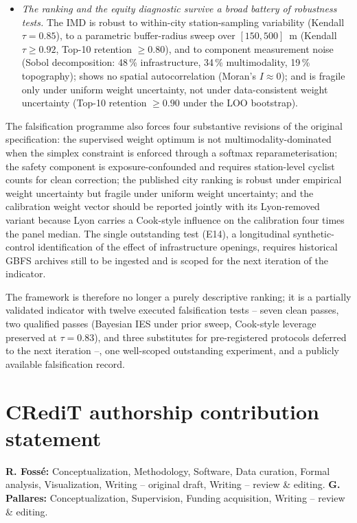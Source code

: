 \documentclass[11pt,a4paper]{article}
\begin{document}
\begin{itemize}
\item[\textbf{Q4.}] \emph{The ranking and the equity diagnostic
survive a broad battery of robustness tests.} The IMD is robust
to within-city station-sampling variability (Kendall $\tau =
0.85$), to a parametric buffer-radius sweep over $[150, 500]$~m
(Kendall $\tau \geq 0.92$, Top-10 retention $\geq 0.80$), and to
component measurement noise (Sobol decomposition: 48\,\%
infrastructure, 34\,\% multimodality, 19\,\% topography); shows
no spatial autocorrelation (Moran's $I \approx 0$); and is
fragile only under uniform weight uncertainty, not under
data-consistent weight uncertainty (Top-10 retention $\geq 0.90$
under the LOO bootstrap).
\end{itemize}

The falsification programme also forces four substantive
revisions of the original specification: the supervised weight
optimum is not multimodality-dominated when the simplex
constraint is enforced through a softmax reparameterisation; the
safety component is exposure-confounded and requires
station-level cyclist counts for clean correction; the published
city ranking is robust under empirical weight uncertainty but
fragile under uniform weight uncertainty; and the calibration
weight vector should be reported jointly with its Lyon-removed
variant because Lyon carries a Cook-style influence on the
calibration four times the panel median. The single outstanding
test (E14), a longitudinal synthetic-control identification of
the effect of infrastructure openings, requires historical GBFS
archives still to be ingested and is scoped for the next
iteration of the indicator.

The framework is therefore no longer a purely descriptive
ranking; it is a partially validated indicator with twelve
executed falsification tests -- seven clean passes, two qualified
passes (Bayesian IES under prior sweep, Cook-style leverage
preserved at $\tau = 0.83$), and three substitutes for
pre-registered protocols deferred to the next iteration --, one
well-scoped outstanding experiment, and a publicly available
falsification record.

\section*{CRediT authorship contribution statement}

\textbf{R. Foss\'e:} Conceptualization, Methodology, Software,
Data curation, Formal analysis, Visualization, Writing -- original
draft, Writing -- review \& editing.
\textbf{G. Pallares:} Conceptualization, Supervision, Funding
acquisition, Writing -- review \& editing.
\end{document}
